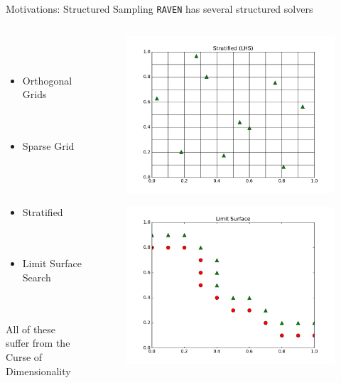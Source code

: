 \documentclass[t,9pt,svgnames]{beamer}
\newcommand{\code}[1]{\texttt{#1}}
\begin{document}
\begin{frame}{Motivations: Structured Sampling}
  \vfill
  \code{RAVEN} has several structured solvers
  \begin{columns}
    \begin{column}{0.5\textwidth}
      ~\\~\\
      \begin{itemize}
        \item Orthogonal Grids
      ~\\~\\~\\
        \item Sparse Grid
      ~\\~\\~\\
        \item Stratified
      ~\\~\\~\\
        \item Limit Surface Search
      \end{itemize}
      ~\\~\\
      All of these suffer from the Curse of Dimensionality
    \end{column}
    \begin{column}{0.5\textwidth}
      \begin{figure}
        \includegraphics[width=0.7\linewidth]{pics/lhs.pdf}
      \end{figure}
      \begin{figure}
        \includegraphics[width=0.7\linewidth]{pics/limit.pdf}
      \end{figure}
    \end{column}
  \end{columns}
  \vfill
\end{frame}
\end{document}
